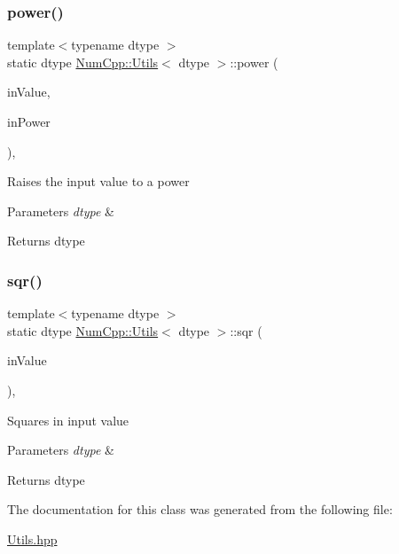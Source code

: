 \subsubsection{\texorpdfstring{power()}{power()}}
{\footnotesize\ttfamily template$<$typename dtype $>$ \\
static dtype \mbox{\hyperlink{class_num_cpp_1_1_utils}{Num\+Cpp\+::\+Utils}}$<$ dtype $>$\+::power (\begin{DoxyParamCaption}\item[{dtype}]{in\+Value,  }\item[{\mbox{\hyperlink{namespace_num_cpp_aee396d0469d6031cd18118c0a45bcdda}{uint8}}}]{in\+Power }\end{DoxyParamCaption})\hspace{0.3cm}{\ttfamily [inline]}, {\ttfamily [static]}}

Raises the input value to a power


\begin{DoxyParams}{Parameters}
{\em dtype} & \\
\hline
\end{DoxyParams}
\begin{DoxyReturn}{Returns}
dtype 
\end{DoxyReturn}
\mbox{\label{class_num_cpp_1_1_utils_a9cf764a51a81bf94d1f2dfec9766d8f9}} 
\subsubsection{\texorpdfstring{sqr()}{sqr()}}
{\footnotesize\ttfamily template$<$typename dtype $>$ \\
static dtype \mbox{\hyperlink{class_num_cpp_1_1_utils}{Num\+Cpp\+::\+Utils}}$<$ dtype $>$\+::sqr (\begin{DoxyParamCaption}\item[{dtype}]{in\+Value }\end{DoxyParamCaption})\hspace{0.3cm}{\ttfamily [inline]}, {\ttfamily [static]}}

Squares in input value


\begin{DoxyParams}{Parameters}
{\em dtype} & \\
\hline
\end{DoxyParams}
\begin{DoxyReturn}{Returns}
dtype 
\end{DoxyReturn}


The documentation for this class was generated from the following file\+:\begin{DoxyCompactItemize}
\item 
\mbox{\hyperlink{_utils_8hpp}{Utils.\+hpp}}\end{DoxyCompactItemize}
